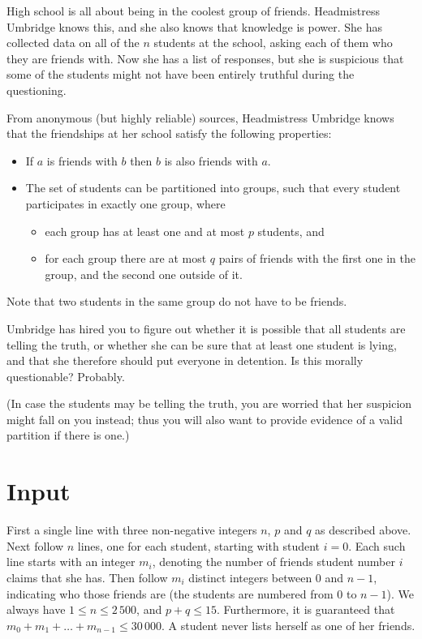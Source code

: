 
\noindent
High school is all about being in the coolest group of friends. Headmistress Umbridge knows this, and she also knows that knowledge is power. She has collected data on all of the $n$ students at the school, asking each of them who they are friends with. Now she has a list of responses, but she is suspicious that some of the students might not have been entirely truthful during the questioning. 

From anonymous (but highly reliable) sources, Headmistress Umbridge knows that the friendships at her school satisfy the following properties:
\begin{itemize}
  \item If $a$ is friends with $b$ then $b$ is also friends with $a$.
  \item The set of students can be partitioned into groups, such that every student participates in exactly one group, where
  \begin{itemize}
    \item each group has at least one and at most $p$ students, and
    \item for each group there are at most $q$ pairs of friends with the first one in the group, and the second one outside of it.
  \end{itemize}
\end{itemize}
\noindent
Note that two students in the same group do not have to be friends.

Umbridge has hired you to figure out whether it is possible that all students are telling the truth, or whether she can be sure that at least one student is lying, and that she therefore should put everyone in detention. Is this morally questionable? Probably. 

(In case the students may be telling the truth, you are worried that her suspicion might fall on you instead; thus you will also want to provide evidence of a valid partition if there is one.)

\section*{Input}
First a single line with three non-negative integers $n$, $p$ and $q$ as described above. Next follow $n$ lines, one for each student, starting with student $i=0$. Each such line starts with an integer $m_i$, denoting the number of friends student number $i$ claims that she has. Then follow $m_i$ distinct integers between $0$ and $n-1$, indicating who those friends are (the students are numbered from $0$ to $n-1$). 
%
We always have $1 \leq n \leq 2\,500$, and $p + q \leq 15$. Furthermore, it is guaranteed that $m_0 + m_1 + \ldots + m_{n-1} \leq 30\,000$. A student never lists herself as one of her friends. 

